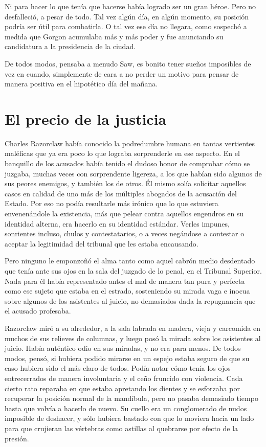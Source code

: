 Ni para hacer lo que tenía que hacerse había logrado ser un gran héroe. Pero no desfalleció, a pesar de todo. Tal vez algún día, en algún momento, su posición podría ser útil para combatirla. O tal vez ese día no llegara, como sospechó a medida que Gorgon acumulaba más y más poder y fue anunciando su candidatura a la presidencia de la ciudad.

De todos modos, pensaba a menudo Saw, es bonito tener sueños imposibles de vez en cuando, simplemente de cara a no perder un motivo para pensar de manera positiva en el hipotético día del mañana.

\section*{El precio de la justicia}

Charles Razorclaw había conocido la podredumbre humana en tantas vertientes maléficas que ya era poco lo que lograba sorprenderle en ese aspecto. En el banquillo de los acusados había tenido el dudoso honor de comprobar cómo se juzgaba, muchas veces con sorprendente ligereza, a los que habían sido algunos de sus peores enemigos, y también los de otros. Él mismo solía solicitar aquellos casos en calidad de uno más de los múltiples abogados de la acusación del Estado. Por eso no podía resultarle más irónico que lo que estuviera envenenándole la existencia, más que pelear contra aquellos engendros en su identidad alterna, era hacerlo en su identidad estándar. Verles impunes, sonrientes incluso, chulos y contestatarios, o a veces negándose a contestar o aceptar la legitimidad del tribunal que les estaba encausando.

Pero ninguno le emponzoñó el alma tanto como aquel cabrón medio desdentado que tenía ante sus ojos en la sala del juzgado de lo penal, en el Tribunal Superior. Nada para él había representado antes el mal de manera tan pura y perfecta como ese sujeto que estaba en el estrado, sosteniendo su mirada vaga e inocua sobre algunos de los asistentes al juicio, no demasiados dada la repugnancia que el acusado profesaba.

Razorclaw miró a su alrededor, a la sala labrada en madera, vieja y carcomida en muchos de sus relieves de columnas, y luego posó la mirada sobre los asistentes al juicio. Había auténtico odio en sus miradas, y no era para menos. De todos modos, pensó, si hubiera podido mirarse en un espejo estaba seguro de que su caso hubiera sido el más claro de todos. Podía notar cómo tenía los ojos entrecerrados de manera involuntaria y el ceño fruncido con violencia. Cada cierto rato reparaba en que estaba apretando los dientes y se esforzaba por recuperar la posición normal de la mandíbula, pero no pasaba demasiado tiempo hasta que volvía a hacerlo de nuevo. Su cuello era un conglomerado de nudos imposible de deshacer, y sólo hubiera bastado con que lo moviera hacia un lado para que crujieran las vértebras como astillas al quebrarse por efecto de la presión.

